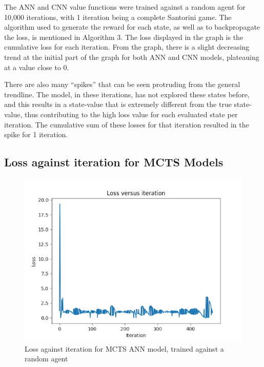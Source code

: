 \documentclass[a4paper,12pt,table]{article}
\begin{document}
The ANN and CNN value functions were trained against a random agent for 10,000 iterations, with 1 iteration being a complete Santorini game. The algorithm used to generate the reward for each state, as well as to backpropagate the loss, is mentioned in Algorithm 3. The loss displayed in the graph is the cumulative loss for each iteration. From the graph, there is a slight decreasing trend at the initial part of the graph for both ANN and CNN models, plateauing at a value close to 0.  \par

There are also many “spikes” that can be seen protruding from the general trendline. The model, in these iterations, has not explored these states before, and this results in a state-value that is extremely different from the true state-value, thus contributing to the high loss value for each evaluated state per iteration. The cumulative sum of these losses for that iteration resulted in the spike for 1 iteration. \par

\subsection{Loss against iteration for MCTS Models}
\begin{figure}[H]
    \begin{center}
        \includegraphics[scale=0.8]{MCTS_ANN.png}
        \caption{Loss against iteration for MCTS ANN model, trained against a random agent}
        \label{fig:}
    \end{center}
\end{figure}
\end{document}
